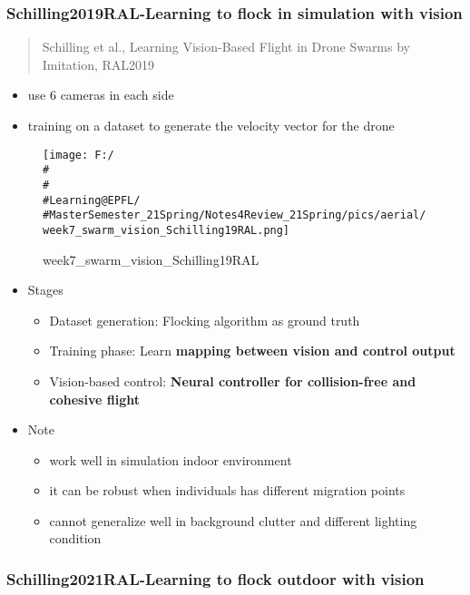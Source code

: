 \documentclass[]{article}
\begin{document}
\subsubsection{Schilling2019RAL-Learning to flock in simulation with
vision}\label{header-n1499}

\begin{quote}
Schilling et al., Learning Vision-Based Flight in Drone Swarms by
Imitation, RAL2019
\end{quote}

\begin{itemize}
\item
  use 6 cameras in each side
\item
  training on a dataset to generate the velocity vector for the drone
\end{itemize}

\begin{figure}
\centering
\texttt{[image: F:/\\\#\\\#\\\#Learning@EPFL/\\\#MasterSemester\_21Spring/Notes4Review\_21Spring/pics/aerial/week7\_swarm\_vision\_Schilling19RAL.png]}
\caption{week7\_swarm\_vision\_Schilling19RAL}
\end{figure}

\begin{itemize}
\item
  Stages

  \begin{itemize}
  \item
    Dataset generation: Flocking algorithm as ground truth
  \item
    Training phase: Learn \textbf{mapping between vision and control
    output}
  \item
    Vision-based control: \textbf{Neural controller for collision-free
    and cohesive flight}
  \end{itemize}
\item
  Note

  \begin{itemize}
  \item
    work well in simulation indoor environment
  \item
    it can be robust when individuals has different migration points
  \item
    cannot generalize well in background clutter and different lighting
    condition
  \end{itemize}
\end{itemize}

\subsubsection{Schilling2021RAL-Learning to flock outdoor with
vision}\label{header-n1527}
\end{document}
